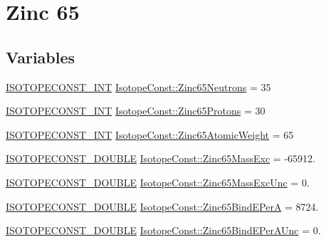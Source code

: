 \hypertarget{group___isotope_const-_zinc-_zn65}{}\section{Zinc 65}
\label{group___isotope_const-_zinc-_zn65}
\subsection*{Variables}
\begin{DoxyCompactItemize}
\item 
\mbox{\hyperlink{group___isotope_const-_macros_ga5f18360b3e99483a35c32d789e62621c}{I\+S\+O\+T\+O\+P\+E\+C\+O\+N\+S\+T\+\_\+\+I\+NT}} \mbox{\hyperlink{group___isotope_const-_zinc-_zn65_ga489ca9365f7b09505b0197199f606fbf}{Isotope\+Const\+::\+Zinc65\+Neutrons}} = 35
\item 
\mbox{\hyperlink{group___isotope_const-_macros_ga5f18360b3e99483a35c32d789e62621c}{I\+S\+O\+T\+O\+P\+E\+C\+O\+N\+S\+T\+\_\+\+I\+NT}} \mbox{\hyperlink{group___isotope_const-_zinc-_zn65_gab967711cd4829ed9af3a69e2a3bad8a5}{Isotope\+Const\+::\+Zinc65\+Protons}} = 30
\item 
\mbox{\hyperlink{group___isotope_const-_macros_ga5f18360b3e99483a35c32d789e62621c}{I\+S\+O\+T\+O\+P\+E\+C\+O\+N\+S\+T\+\_\+\+I\+NT}} \mbox{\hyperlink{group___isotope_const-_zinc-_zn65_gacd9bef977b5a9cb8e88215f2151c724b}{Isotope\+Const\+::\+Zinc65\+Atomic\+Weight}} = 65
\item 
\mbox{\hyperlink{group___isotope_const-_macros_ga8f45a7272ce02c0b4c65c44636ed719a}{I\+S\+O\+T\+O\+P\+E\+C\+O\+N\+S\+T\+\_\+\+D\+O\+U\+B\+LE}} \mbox{\hyperlink{group___isotope_const-_zinc-_zn65_ga6258c8aff40f7656fbc474268f49cea6}{Isotope\+Const\+::\+Zinc65\+Mass\+Exc}} = -\/65912.
\item 
\mbox{\hyperlink{group___isotope_const-_macros_ga8f45a7272ce02c0b4c65c44636ed719a}{I\+S\+O\+T\+O\+P\+E\+C\+O\+N\+S\+T\+\_\+\+D\+O\+U\+B\+LE}} \mbox{\hyperlink{group___isotope_const-_zinc-_zn65_ga0c45dda606e86ad2989468a47df48241}{Isotope\+Const\+::\+Zinc65\+Mass\+Exc\+Unc}} = 0.
\item 
\mbox{\hyperlink{group___isotope_const-_macros_ga8f45a7272ce02c0b4c65c44636ed719a}{I\+S\+O\+T\+O\+P\+E\+C\+O\+N\+S\+T\+\_\+\+D\+O\+U\+B\+LE}} \mbox{\hyperlink{group___isotope_const-_zinc-_zn65_ga9a1fe90780eca0ce215d3ce3c5e62f68}{Isotope\+Const\+::\+Zinc65\+Bind\+E\+PerA}} = 8724.
\item 
\mbox{\hyperlink{group___isotope_const-_macros_ga8f45a7272ce02c0b4c65c44636ed719a}{I\+S\+O\+T\+O\+P\+E\+C\+O\+N\+S\+T\+\_\+\+D\+O\+U\+B\+LE}} \mbox{\hyperlink{group___isotope_const-_zinc-_zn65_ga2fd382f12ce6741fb2107e9d946da1f4}{Isotope\+Const\+::\+Zinc65\+Bind\+E\+Per\+A\+Unc}} = 0.

\end{DoxyCompactItemize}
